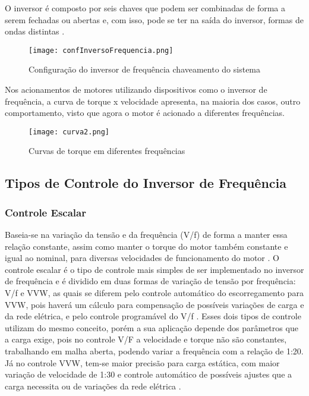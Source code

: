 			O inversor é composto por seis chaves que podem ser combinadas de forma a serem fechadas ou abertas e, com isso, pode se ter na saída do inversor, formas de ondas distintas \cite{WEGIF}.

			\begin{figure}[!h]
				\centering
				\texttt{[image: confInversoFrequencia.png]}
				\caption[Configuração do inversor de frequência chaveamento do sistema]{Configuração do inversor de frequência chaveamento do sistema \cite{WEGIF}} 
				\label{confInversoFrequencia}
			\end{figure}

			Nos acionamentos de motores utilizando dispositivos como o inversor de frequência, a curva de torque x velocidade apresenta, na maioria dos casos, outro comportamento, visto que agora o motor é acionado a diferentes frequências.

			\begin{figure}[!h]
				\centering
				\texttt{[image: curva2.png]}
				\caption[Curvas de torque em diferentes frequências]{Curvas de torque em diferentes frequências \cite{Bose}} 
				\label{curva2}
			\end{figure}

		\subsection{Tipos de Controle do Inversor de Frequência}

			\subsubsection{Controle Escalar}

				Baseia-se na variação da tensão e da frequência (V/f) de forma a manter essa relação constante, assim como manter o torque do motor também constante e igual ao nominal, para diversas velocidades de funcionamento do motor \cite{WEGIF}. O controle escalar é o tipo de controle mais simples de ser implementado no inversor de frequência e é dividido em duas formas de variação de tensão por frequência: V/f e VVW, as quais se diferem pelo controle automático do escorregamento para VVW, pois haverá um cálculo para compensação de possíveis variações de carga e da rede elétrica, e pelo controle programável do V/f \cite{WEGIF}. Esses dois tipos de controle utilizam do mesmo conceito, porém a sua aplicação depende dos parâmetros que a carga exige, pois no controle V/F a velocidade e torque não são constantes, trabalhando em malha aberta, podendo variar a frequência com a relação de 1:20. Já no controle VVW, tem-se maior precisão para carga estática, com maior variação de velocidade de 1:30 e controle automático de possíveis ajustes que a carga necessita ou de variações da rede elétrica \cite{WEGIF}.

